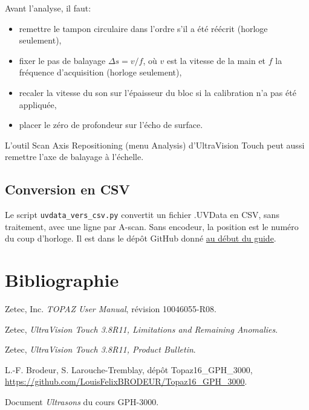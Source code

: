 \documentclass[11pt,letterpaper]{article}
\begin{document}
Avant l'analyse, il faut:
\begin{itemize}
  \item remettre le tampon circulaire dans l'ordre s'il a \'et\'e r\'e\'ecrit (horloge seulement),
  \item fixer le pas de balayage $\Delta s = v / f$, o\`u $v$ est la vitesse de la main et $f$ la fr\'equence d'acquisition (horloge seulement),
  \item recaler la vitesse du son sur l'\'epaisseur du bloc si la calibration n'a pas \'et\'e appliqu\'ee,
  \item placer le z\'ero de profondeur sur l'\'echo de surface.
\end{itemize}

L'outil Scan Axis Repositioning (menu Analysis) d'UltraVision Touch peut aussi remettre l'axe de balayage \`a l'\'echelle.

\subsection{Conversion en CSV}
\label{sec:csv}

Le script \texttt{uvdata\_vers\_csv.py} convertit un fichier .UVData en CSV, sans traitement, avec une ligne par A-scan. Sans encodeur, la position est le num\'ero du coup d'horloge. Il est dans le d\'ep\^ot GitHub donn\'e \hyperref[sec:avant]{au d\'ebut du guide}.

\section{Bibliographie}

Zetec, Inc. \emph{TOPAZ User Manual}, r\'evision 10046055-R08.

Zetec, \emph{UltraVision Touch 3.8R11, Limitations and Remaining Anomalies}.

Zetec, \emph{UltraVision Touch 3.8R11, Product Bulletin}.

L.-F. Brodeur, S. Larouche-Tremblay, d\'ep\^ot Topaz16\_GPH\_3000, \url{https://github.com/LouisFelixBRODEUR/Topaz16_GPH_3000}.

Document \emph{Ultrasons} du cours GPH-3000.
\end{document}
